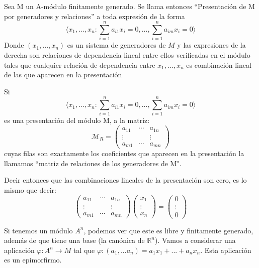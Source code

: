 \begin{ndef}
	Sea M un A-módulo finitamente generado. Se llama entonces “Presentación de M por generadores y relaciones” a toda expresión de la forma
	\[
	\langle x_1,...,x_n : \sum_{i=1}^n a_{i1}x_i = 0,...,\sum_{i=1}^n a_{im}x_i = 0 \rangle
	\]
	Donde $(x_1,...,x_n)$ es un sistema de generadores de $M$ y las expresiones de la derecha son relaciones de dependencia lineal entre ellos verificadas en el módulo tales que cualquier relación de dependencia entre $x_1,...,x_n$ es combinación lineal de las que aparecen en la presentación

\end{ndef}

\begin{nprop}
		Si
	\[
	\langle x_1,...,x_n : \sum_{i=1}^n a_{i1}x_i = 0,...,\sum_{i=1}^n a_{im}x_i = 0 \rangle
	\]
	es una presentación del módulo M, a la matriz:
	\[
	\mathcal{M}_R = \begin{pmatrix}
 a_{11} & \cdots & a_{1n}\\
 \vdots & & \vdots\\
 a_{m1} & \cdots & a_{mn}
\end{pmatrix}
	\]
	cuyas filas son exactamente los coeficientes que aparecen en la presentación la llamamos “matriz de relaciones de los generadores de M".

	Decir entonces que las combinaciones lineales de la presentación son cero, es lo mismo que decir:
	\[
	\begin{pmatrix}
 a_{11} & \cdots & a_{1n}\\
 \vdots & & \vdots\\
 a_{m1} & \cdots & a_{mn}
\end{pmatrix} \begin{pmatrix}
 x_1  \\
 \vdots\\
 x_n
\end{pmatrix} =  \begin{pmatrix}
 0  \\
 \vdots\\
 0
\end{pmatrix}
	\]
\end{nprop}


	Si tenemos un módulo $A^n$, podemos ver que este es libre y finitamente generado, además de que tiene una base (la canónica de $\mathbb{R}^n$). Vamos a considerar una aplicación $\varphi: A^n \to M$ tal que $\varphi:(a_1,...a_n) = a_1x_1+...+a_nx_n$. Esta aplicación es un epimorfirmo.

